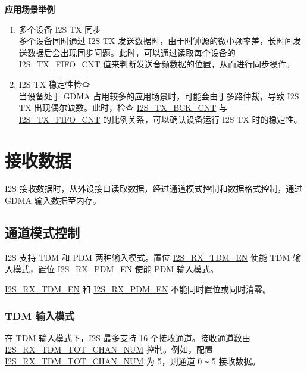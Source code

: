\documentclass[main\_\_CN.tex]{subfiles}
\begin{document}
\textbf{应用场景举例}
\begin{enumerate}
    \item 多个设备 I2S TX 同步\\
    多个设备同时通过 I2S TX 发送数据时，由于时钟源的微小频率差，长时间发送数据后会出现同步问题。此时，可以通过读取每个设备的 \hyperref[fielddesc:I2STXFIFOCNT]{I2S\_TX\_FIFO\_CNT} 值来判断发送音频数据的位置，从而进行同步操作。
    \item I2S TX 稳定性检查\\
    当设备处于 GDMA 占用较多的应用场景时，可能会由于多路仲裁，导致 I2S TX 出现偶尔缺数。此时，检查 \hyperref[fielddesc:I2STXBCKCNT]{I2S\_TX\_BCK\_CNT} 与 \hyperref[fielddesc:I2STXFIFOCNT]{I2S\_TX\_FIFO\_CNT} 的比例关系，可以确认设备运行 I2S TX 时的稳定性。
\end{enumerate}


\section{接收数据}\label{sec:i2s-rx-data}

I2S 接收数据时，从外设接口读取数据，经过通道模式控制和数据格式控制，通过 GDMA 输入数据至内存。

\subsection{通道模式控制}

\chipname{} I2S 支持 TDM 和 PDM 两种输入模式。置位 \hyperref[fielddesc:I2SRXTDMEN]{I2S\_RX\_TDM\_EN} 使能 TDM 输入模式，置位 \hyperref[fielddesc:I2SRXPDMEN]{I2S\_RX\_PDM\_EN} 使能 PDM 输入模式。

\begin{tiplisting}
\hyperref[fielddesc:I2SRXTDMEN]{I2S\_RX\_TDM\_EN} 和 \hyperref[fielddesc:I2SRXPDMEN]{I2S\_RX\_PDM\_EN} 不能同时置位或同时清零。
\end{tiplisting}
\vspace{-1em}

\subsubsection{TDM 输入模式}


在 TDM 输入模式下，I2S 最多支持 16 个接收通道。接收通道数由 \hyperref[fielddesc:I2SRXTDMTOTCHANNUM]{I2S\_RX\_TDM\_TOT\_CHAN\_NUM} 控制。例如，配置 \hyperref[fielddesc:I2SRXTDMTOTCHANNUM]{I2S\_RX\_TDM\_TOT\_CHAN\_NUM} 为 5，则通道 0 \verb+~+ 5 接收数据。
\end{document}
